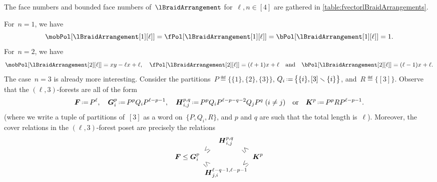 The face numbers and bounded face numbers of~$\lBraidArrangement$ for~$\ell, n \in [4]$ are gathered in \cref{table:fvectorlBraidArrangements}.

\begin{example}
For~$n = 1$, we have
\[
\mobPol[{\lBraidArrangement[1][\ell]}] = \fPol[{\lBraidArrangement[1][\ell]}] = \bPol[{\lBraidArrangement[1][\ell]}] = 1.
\]
For~$n = 2$, we have
\[
\mobPol[{\lBraidArrangement[2][\ell]}] = xy-\ell x+\ell,
\quad
\fPol[{\lBraidArrangement[2][\ell]}] = (\ell+1)x+\ell
\quad\text{and}\quad
\bPol[{\lBraidArrangement[2][\ell]}] = (\ell-1)x+\ell.
\]
The case~$n = 3$ is already more interesting.
Consider the partitions~$P \eqdef \big\{ \{1\}, \{2\}, \{3\} \big\}$, $Q_i \eqdef \big\{ \{i\}, [3] \ssm \{i\} \big\}$, and~$R \eqdef \big\{ [3] \big\}$.
Observe that the $(\ell,3)$-forests are all of the form
\begin{gather*}
\b{F} \eqdef P^\ell,
\quad
\b{G}_i^p \eqdef P^p Q_i P^{\ell-p-1}, %
\quad
\b{H}_{i,j}^{p,q} \eqdef P^p Q_i P^{\ell-p-q-2} Q_j P^q \;\text{($i \ne j$)} %
\quad\text{or}\quad
\b{K}^p \eqdef P^p R P^{\ell-p-1}. %
\end{gather*}
(where we write a tuple of partitions of~$[3]$ as a word on~$\{P, Q_i, R\}$, and $p$ and $q$ are such that the total length is~$\ell$).
Moreover, the cover relations in the $(\ell,3)$-forest poset are precisely the relations
\[
\b{F} \le \b{G}_i^p \begin{array}{c@{\hspace{-.3cm}}c@{\hspace{-.3cm}}c} & \b{H}_{i,j}^{p,q} & \\ \rotatebox[origin=c]{45}{$\le$} & & \rotatebox[origin=c]{-45}{$\le$} \\[.3cm] \rotatebox[origin=c]{-45}{$\le$} & & \rotatebox[origin=c]{45}{$\le$} \\ & \b{H}_{j,i}^{\ell-q-1, \ell-p-1} & \end{array} \b{K}^p
\]
\end{example}
